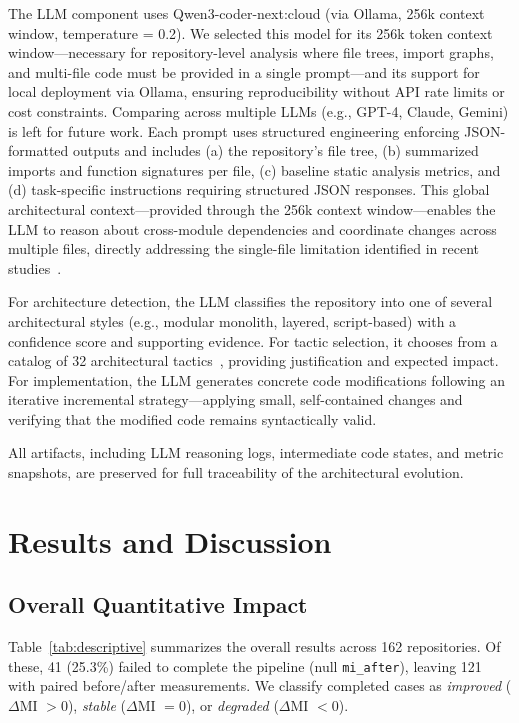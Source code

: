 \documentclass[sigconf,review,anonymous]{acmart}
\begin{document}
The LLM component uses Qwen3-coder-next:cloud (via Ollama, 256k context window, temperature = 0.2). We selected this model for its 256k token context window---necessary for repository-level analysis where file trees, import graphs, and multi-file code must be provided in a single prompt---and its support for local deployment via Ollama, ensuring reproducibility without API rate limits or cost constraints. Comparing across multiple LLMs (e.g., GPT-4, Claude, Gemini) is left for future work. Each prompt uses structured engineering enforcing JSON-formatted outputs and includes (a) the repository's file tree, (b) summarized imports and function signatures per file, (c) baseline static analysis metrics, and (d) task-specific instructions requiring structured JSON responses. This global architectural context---provided through the 256k context window---enables the LLM to reason about cross-module dependencies and coordinate changes across multiple files, directly addressing the single-file limitation identified in recent studies~\cite{piao2025refactoring}.

For architecture detection, the LLM classifies the repository into one of several architectural styles (e.g., modular monolith, layered, script-based) with a confidence score and supporting evidence. For tactic selection, it chooses from a catalog of 32 architectural tactics~\cite{bass2021software, marquez2022architectural}, providing justification and expected impact. For implementation, the LLM generates concrete code modifications following an iterative incremental strategy---applying small, self-contained changes and verifying that the modified code remains syntactically valid.

All artifacts, including LLM reasoning logs, intermediate code states, and metric snapshots, are preserved for full traceability of the architectural evolution.

\section{Results and Discussion}

\subsection{Overall Quantitative Impact}

Table~\ref{tab:descriptive} summarizes the overall results across 162 repositories. Of these, 41 (25.3\%) failed to complete the pipeline (null \texttt{mi\_after}), leaving 121 with paired before/after measurements. We classify completed cases as \textit{improved} ($\Delta$MI $> 0$), \textit{stable} ($\Delta$MI $= 0$), or \textit{degraded} ($\Delta$MI $< 0$).
\end{document}

